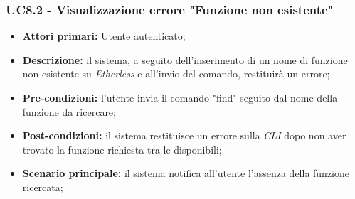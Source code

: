 \subsubsection{UC8.2 - Visualizzazione errore "Funzione non esistente"}
\begin{itemize}
	\item \textbf{Attori primari:} Utente autenticato;
	\item \textbf{Descrizione:} il sistema, a seguito dell'inserimento di un nome di funzione non esistente su \textit{Etherless} e all'invio del comando, restituirà un errore; 
	\item \textbf{Pre-condizioni:} l'utente invia il comando "find" seguito dal nome della funzione da ricercare;
	\item \textbf{Post-condizioni:} il sistema restituisce un errore sulla \textit{CLI\glo} dopo non aver trovato la funzione richiesta tra le disponibili;
	\item \textbf{Scenario principale:} il sistema notifica all'utente l'assenza della funzione ricercata;
\end{itemize}